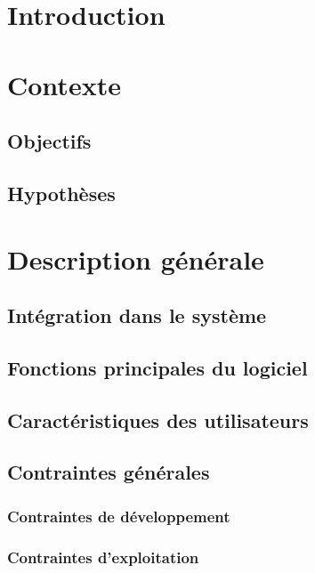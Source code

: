 \documentclass[asi]{picINSA}
\title{\DSE{}}
\author{\Pierre} %
\begin{document}
\couverture{}

 \informationsGenerales{}
%

\tableofcontents

\setcounter{chapter}{0}


\chapter*{Introduction}

\chapter{Contexte}

\section{Objectifs}
\section{Hypothèses}

\chapter{Description générale}

\section{Intégration dans le système}

\section{Fonctions principales du logiciel}

\section{Caractéristiques des utilisateurs}

\section{Contraintes générales}

\subsection{Contraintes de développement}

\subsection{Contraintes d'exploitation}
\end{document}
